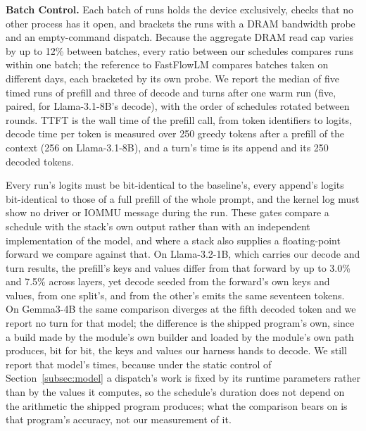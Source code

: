 \textbf{Batch Control.}
Each batch of runs holds the device exclusively, checks that no other process has it open, and brackets the runs with a DRAM bandwidth probe and an empty-command dispatch.
Because the aggregate DRAM read cap varies by up to 12\% between batches, every ratio between our schedules compares runs within one batch; the reference to FastFlowLM compares batches taken on different days, each bracketed by its own probe.
We report the median of five timed runs of prefill and three of decode and turns after one warm run (five, paired, for Llama-3.1-8B's decode), with the order of schedules rotated between rounds.
TTFT is the wall time of the prefill call, from token identifiers to logits, decode time per token is measured over 250 greedy tokens after a prefill of the context (256 on Llama-3.1-8B), and a turn's time is its append and its 250 decoded tokens.

Every run's logits must be bit-identical to the baseline's, every append's logits bit-identical to those of a full prefill of the whole prompt, and the kernel log must show no driver or IOMMU message during the run.
These gates compare a schedule with the stack's own output rather than with an independent implementation of the model, and where a stack also supplies a floating-point forward we compare against that.
On Llama-3.2-1B, which carries our decode and turn results, the prefill's keys and values differ from that forward by up to 3.0\% and 7.5\% across layers, yet decode seeded from the forward's own keys and values, from one split's, and from the other's emits the same seventeen tokens.
On Gemma3-4B the same comparison diverges at the fifth decoded token and we report no turn for that model; the difference is the shipped program's own, since a build made by the module's own builder and loaded by the module's own path produces, bit for bit, the keys and values our harness hands to decode.
We still report that model's times, because under the static control of Section~\ref{subsec:model} a dispatch's work is fixed by its runtime parameters rather than by the values it computes, so the schedule's duration does not depend on the arithmetic the shipped program produces; what the comparison bears on is that program's accuracy, not our measurement of it.

